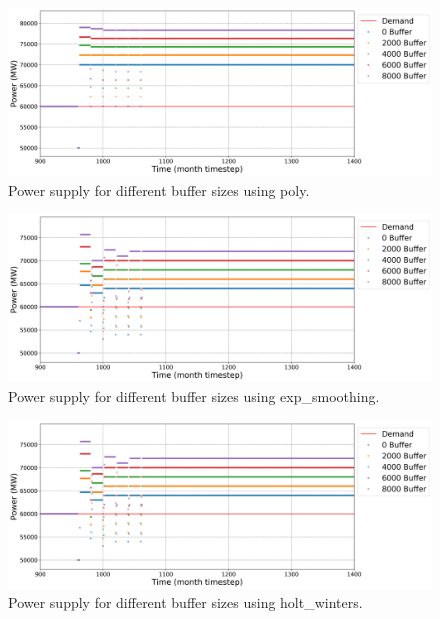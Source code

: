 \documentclass[11pt]{article}
\begin{document}
\begin{figure}[H]
	\centering
	\includegraphics[width=\textwidth]{29-figures/29-power-buffer-poly.png} 
	\hfill
	\caption{Power supply for different buffer sizes using poly.}
	\label{fig:29-buf-poly}
\end{figure}

\begin{figure}[H]
	\centering
	\includegraphics[width=\textwidth]{29-figures/29-power-buffer-exp_smoothing.png} 
	\hfill
	\caption{Power supply for different buffer sizes using exp\_smoothing.}
	\label{fig:29-buf-exp_smoothing}
\end{figure}

\begin{figure}[H]
	\centering
	\includegraphics[width=\textwidth]{29-figures/29-power-buffer-holt_winters.png} 
	\hfill
	\caption{Power supply for different buffer sizes using holt\_winters.}
	\label{fig:29-buf-hots_winters}
\end{figure}
\end{document}
